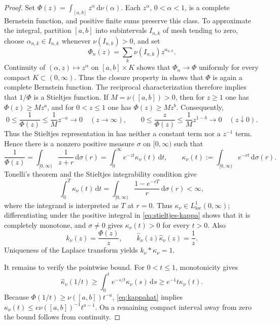 \documentclass[11pt]{article}
\numberwithin{equation}{section}
\theoremstyle{definition}
\theoremstyle{remark}
\newcommand{\dd}{\,\mathrm d}
\begin{document}
\begin{proof}
Set $\Phi(z)=\int_{[a,b]}z^\alpha\dd\nu(\alpha)$. Each $z^\alpha$, $0<\alpha<1$, is a complete Bernstein function, and positive finite sums preserve this class. To approximate the integral, partition $[a,b]$ into subintervals $I_{n,k}$ of mesh tending to zero, choose $\alpha_{n,k}\in I_{n,k}$ whenever $\nu(I_{n,k})>0$, and set
\begin{equation*}
\Phi_n(z)=\sum_k\nu(I_{n,k})z^{\alpha_{n,k}}.
\end{equation*}
Continuity of $(\alpha,z)\mapsto z^\alpha$ on $[a,b]\times K$ shows that $\Phi_n\to\Phi$ uniformly for every compact $K\subset(0,\infty)$. Thus the closure property in \cite[Corollary~7.6]{Schilling2012} shows that $\Phi$ is again a complete Bernstein function. The reciprocal characterization \cite[Theorem~7.3]{Schilling2012} therefore implies that $1/\Phi$ is a Stieltjes function. If $M=\nu([a,b])>0$, then for $z\ge1$ one has $\Phi(z)\ge Mz^a$, and for $0<z\le1$ one has $\Phi(z)\ge Mz^b$. Consequently,
\begin{equation*}
0\le\frac1{\Phi(z)}\le\frac1M z^{-a}\longrightarrow0
\quad(z\to\infty),
\qquad
0\le\frac z{\Phi(z)}\le\frac1M z^{1-b}\longrightarrow0
\quad(z\downarrow0).
\end{equation*}
Thus the Stieltjes representation in \cite[Theorem~2.2]{Schilling2012} has neither a constant term nor a $z^{-1}$ term. Hence there is a nonzero positive measure $\sigma$ on $[0,\infty)$ such that
\begin{equation}
\frac1{\Phi(z)}=\int_{[0,\infty)}\frac1{z+r}\dd\sigma(r)
=\int_0^\infty e^{-zt}\kappa_\nu(t)\dd t,
\qquad
\kappa_\nu(t):=\int_{[0,\infty)}e^{-rt}\dd\sigma(r).
\label{eq:stieltjes-kappa}
\end{equation}
Tonelli's theorem and the Stieltjes integrability condition give
\begin{equation*}
\int_0^T\kappa_\nu(t)\dd t
=\int_{[0,\infty)}\frac{1-e^{-rT}}{r}\dd\sigma(r)<\infty,
\end{equation*}
where the integrand is interpreted as $T$ at $r=0$. Thus $\kappa_\nu\in L^1_{\mathrm{loc}}(0,\infty)$; differentiating under the positive integral in \eqref{eq:stieltjes-kappa} shows that it is completely monotone, and $\sigma\ne0$ gives $\kappa_\nu(t)>0$ for every $t>0$. Also
\begin{equation*}
\widehat k_\nu(z)=\frac{\Phi(z)}{z},
\qquad \widehat k_\nu(z)\widehat\kappa_\nu(z)=\frac1z.
\end{equation*}
Uniqueness of the Laplace transform yields $k_\nu*\kappa_\nu=1$.

It remains to verify the pointwise bound. For $0<t\le1$, monotonicity gives
\begin{equation*}
\widehat\kappa_\nu(1/t)
\ge\int_0^te^{-s/t}\kappa_\nu(s)\dd s
\ge e^{-1}t\kappa_\nu(t).
\end{equation*}
Because $\Phi(1/t)\ge\nu([a,b])t^{-a}$, \eqref{eq:kappahat} implies $\kappa_\nu(t)\le e\nu([a,b])^{-1}t^{a-1}$. On a remaining compact interval away from zero the bound follows from continuity.
\end{proof}
\end{document}
